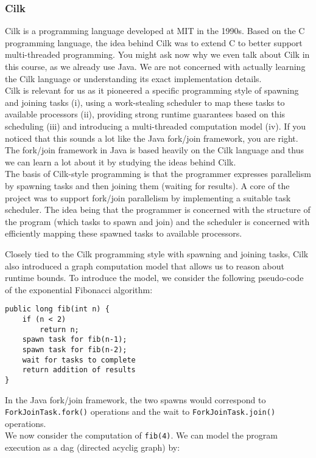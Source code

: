 \documentclass[main.tex]{subfiles}
\begin{document}
\subsubsection{Cilk}
Cilk is a programming language developed at MIT in the 1990s. Based on the C programming language, the idea behind Cilk was to extend C to better support multi-threaded programming. You might ask now why we even talk about Cilk in this course, as we already use Java. We are not concerned with actually learning the Cilk language or understanding its exact implementation details.\\
Cilk is relevant for us as it pioneered a specific programming style of spawning and joining tasks (i), using a work-stealing scheduler to map these tasks to available processors (ii), providing strong runtime guarantees based on this scheduling (iii) and introducing a multi-threaded computation model (iv). If you noticed that this sounds a lot like the Java fork/join framework, you are right. The fork/join framework in Java is based heavily on the Cilk language and thus we can learn a lot about it by studying the ideas behind Cilk.\\
The basis of Cilk-style programming is that the programmer expresses parallelism by spawning tasks and then joining them (waiting for results). A core of the project was to support fork/join parallelism by implementing a suitable task scheduler. The idea being that the programmer is concerned with the structure of the program (which tasks to spawn and join) and the scheduler is concerned with efficiently mapping these spawned tasks to available processors.


Closely tied to the Cilk programming style with spawning and joining tasks, Cilk also introduced a graph computation model that allows us to reason about runtime bounds. To introduce the model, we consider the following pseudo-code of the exponential Fibonacci algorithm:

\newpage

\begin{verbatim}
public long fib(int n) {
    if (n < 2)
        return n;
    spawn task for fib(n-1);
    spawn task for fib(n-2);
    wait for tasks to complete
    return addition of results
}
\end{verbatim}

\noindent In the Java fork/join framework, the two spawns would correspond to \texttt{ForkJoinTask.fork()} operations and the wait to \texttt{ForkJoinTask.join()} operations.\\
We now consider the computation of \texttt{fib(4)}. We can model the program execution as a dag (directed acyclig graph) by:
\end{document}
